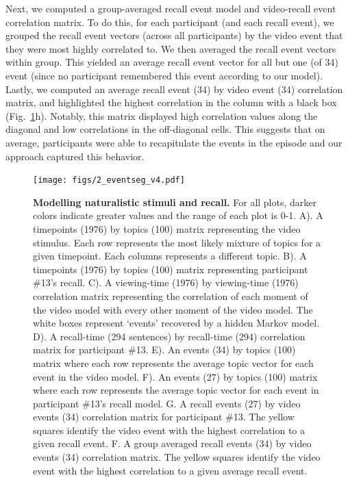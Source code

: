 \documentclass{article}
\begin{document}
{Next, we computed a group-averaged recall event model and video-recall event correlation matrix.  To do this, for each participant (and each recall event), we grouped the recall event vectors (across all participants) by the video event that they were most highly correlated to. We then averaged the recall event vectors within group. This yielded an average recall event vector for all but one (of 34) event (since no participant remembered this event according to our model). Lastly, we computed an average recall event (34) by video event (34) correlation matrix, and highlighted the highest correlation in the column with a black box (Fig.~\ref{fig:model}h). Notably, this matrix displayed high correlation values along the diagonal and low correlations in the off-diagonal cells. This suggests that on average, participants were able to recapitulate the events in the episode and our approach captured this behavior.

\begin{figure}[ht!]
\centering
\texttt{[image: figs/2\_eventseg\_v4.pdf]}
\caption{\small \textbf{Modelling naturalistic stimuli and recall.} For all plots, darker colors indicate greater values and the range of each plot is 0-1.  A). A timepoints (1976) by topics (100) matrix representing the video stimulus.  Each row represents the most likely mixture of topics for a given timepoint. Each columns represents a different topic. B). A timepoints (1976) by topics (100) matrix representing participant \#13's recall. C). A viewing-time (1976) by viewing-time (1976) correlation matrix representing the correlation of each moment of the video model with every other moment of the video model. The white boxes represent `events' recovered by a hidden Markov model. D). A recall-time (294 sentences) by recall-time (294) correlation matrix for participant \#13. E). An events (34) by topics (100) matrix where each row represents the average topic vector for each event in the video model.  F). An events (27) by topics (100) matrix where each row represents the average topic vector for each event in participant \#13's recall model. G. A recall events (27) by video events (34) correlation matrix for participant \#13. The yellow squares identify the video event with the highest correlation to a given recall event. F. A group averaged recall events (34) by video events (34) correlation matrix.  The yellow squares identify the video event with the highest correlation to a given average recall event.}
\label{fig:model}
\end{figure}


}
\end{document}
